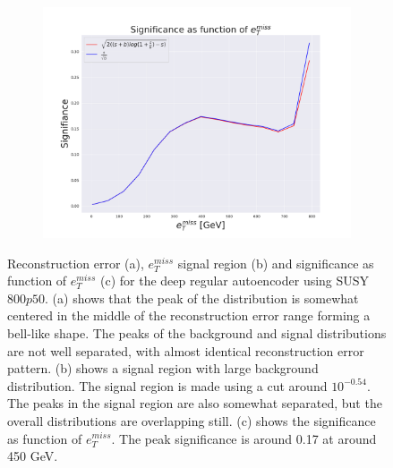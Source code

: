 \begin{figure}[H]
    \hfill  
    \begin{subfigure}{.40\textwidth}
        \includegraphics[width=\textwidth]{Figures/VAE_testing/small/2lep/significance_etmiss_800p0p050_-0.6406612200568815.pdf}
        \caption{}
        \label{fig:VAE_2lep_small_signi_800_2}
    \end{subfigure}
    \hfill      
    \caption[2lep shallow network | $800p50$ | VAE | 2]{Reconstruction error (a), $e_T^{miss}$ signal region (b) and significance as function of 
    $e_T^{miss}$ (c) for the deep regular autoencoder using SUSY $800p50$. 
    (a) shows that the peak of the distribution is somewhat centered in the middle 
    of the reconstruction error range forming a bell-like shape. The peaks of the background and signal 
    distributions are not well separated, with almost identical reconstruction error pattern. (b) 
    shows a signal region with large background distribution. The signal region is made using a cut around
    $10^{-0.54}$. The peaks in the signal region are also somewhat 
    separated, but the overall distributions are overlapping still. 
    (c) shows the significance as function of $e_T^{miss}$. 
    The peak significance is around 0.17 at around 450 GeV.}
    \label{fig:VAE_2lep_small_rec_sig_signi_800_2}
\end{figure}




























